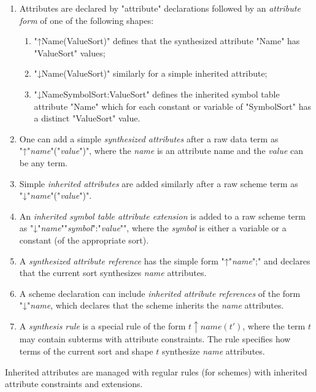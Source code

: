 \documentclass[11pt]{article} %
\begin{document}
\begin{manual}\label{man:attributes}\leavevmode
  \begin{enumerate}

  \item Attributes are declared by "attribute" declarations followed by an \emph{attribute form} of
    one of the following shapes:
    \begin{enumerate}
    \item "↑Name(ValueSort)" defines that the synthesized attribute "Name" has "ValueSort" values;
    \item "↓Name(ValueSort)" similarly for a simple inherited attribute;
    \item "↓Name{SymbolSort:ValueSort}" defines the inherited symbol table attribute "Name" which
      for each constant or variable of "SymbolSort" has a distinct "ValueSort" value.
    \end{enumerate}

  \item One can add a simple \emph{synthesized attributes} after a raw data term as
    "↑"\emph{name}"("\emph{value}")", where the \emph{name} is an attribute name and the
    \emph{value} can be any term.

  \item Simple \emph{inherited attributes} are added similarly after a raw scheme term as
    "↓"\emph{name}"("\emph{value}")".

  \item An \emph{inherited symbol table attribute extension} is added to a raw scheme term as
    "↓"\emph{name}"{"\emph{symbol}":"\emph{value}"}", where the \emph{symbol} is either a variable
    or a constant (of the appropriate sort).

  \item A \emph{synthesized attribute reference} has the simple form "↑"\emph{name}";" and declares
    that the current sort synthesizes \emph{name} attributes.

  \item A scheme declaration can include \emph{inherited attribute references} of the form
    "↓"\emph{name}, which declares that the scheme inherits the \emph{name} attributes.

  \item A \emph{synthesis rule} is a special rule of the form $t↑name(t')$, where the term $t$ may
    contain subterms with attribute constraints. The rule specifies how terms of the current sort
    and shape $t$ synthesize \emph{name} attributes.

  \end{enumerate}
  Inherited attributes are managed with regular rules (for schemes) with inherited attribute
  constraints and extensions.
\end{manual}
\end{document}
